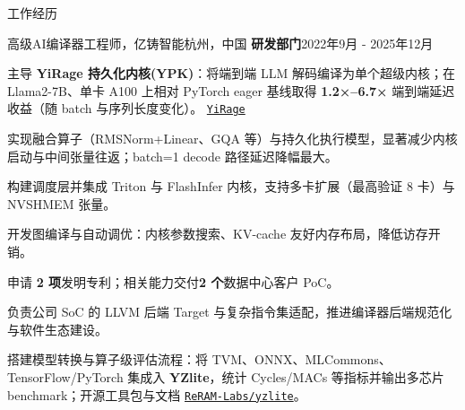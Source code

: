 \documentclass{resume} %
\newcommand{\repo}[2]{\href{#2}{\small\nolinkurl{#1}}}
\begin{document}
\begin{rSection}{工作经历}
\begin{rSubsection}{高级AI编译器工程师，亿铸智能}{杭州，中国}
{\textbf{研发部门}}{2022年9月 - 2025年12月}
\item {主导 {\textbf{YiRage 持久化内核(YPK)}}：将端到端 LLM 解码编译为单个超级内核；在 Llama2-7B、单卡 A100 上相对 PyTorch eager 基线取得 {\textbf{1.2×–6.7×}} 端到端延迟收益（随 batch 与序列长度变化）。 \repo{YiRage}{https://github.com/chenxingqiang/YiRage}}\\
\item {实现融合算子（RMSNorm+Linear、GQA 等）与持久化执行模型，显著减少内核启动与中间张量往返；batch=1 decode 路径延迟降幅最大。}\\
\item {构建调度层并集成 Triton 与 FlashInfer 内核，支持多卡扩展（最高验证 8 卡）与 NVSHMEM 张量。}\\
\item {开发图编译与自动调优：内核参数搜索、KV-cache 友好内存布局，降低访存开销。}\\
\item {申请 {\textbf{2 项}}发明专利；相关能力交付{\textbf{2 个}}数据中心客户 PoC。}\\
\item {负责公司 SoC 的 LLVM 后端 Target 与复杂指令集适配，推进编译器后端规范化与软件生态建设。}\\
\item {搭建模型转换与算子级评估流程：将 TVM、ONNX、MLCommons、TensorFlow/PyTorch 集成入 {\textbf{YZlite}}，统计 Cycles/MACs 等指标并输出多芯片 benchmark；开源工具包与文档 \repo{ReRAM-Labs/yzlite}{https://github.com/ReRAM-Labs/yzlite}。}\\
\end{rSubsection}


\end{rSection}
\end{document}

